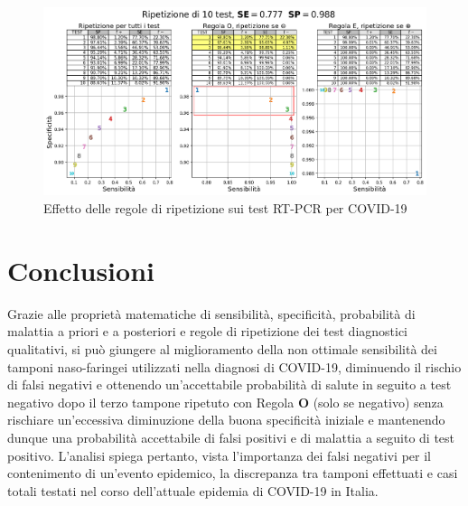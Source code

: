 \documentclass[11pt]{article}
\begin{document}
    
    \begin{figure}
\centering
    \includegraphics{ripetizione-covid}
    \caption{Effetto delle regole di ripetizione sui test RT-PCR per COVID-19}
    \label{fig:ripetizione-covid}
\end{figure}

    \hypertarget{conclusioni}{%
\section{Conclusioni}\label{conclusioni}}

Grazie alle proprietà matematiche di sensibilità, specificità,
probabilità di malattia a priori e a posteriori e regole di ripetizione
dei test diagnostici qualitativi, si può giungere al miglioramento della
non ottimale sensibilità dei tamponi naso-faringei utilizzati nella
diagnosi di COVID-19, diminuendo il rischio di falsi negativi e
ottenendo un'accettabile probabilità di salute in seguito a test
negativo dopo il terzo tampone ripetuto con Regola \textbf{O} (solo se
negativo) senza rischiare un'eccessiva diminuzione della buona
specificità iniziale e mantenendo dunque una probabilità accettabile di
falsi positivi e di malattia a seguito di test positivo. L'analisi
spiega pertanto, vista l'importanza dei falsi negativi per il
contenimento di un'evento epidemico, la discrepanza tra tamponi
effettuati e casi totali testati nel corso dell'attuale epidemia di
COVID-19 in Italia.


    
    



    
\end{document}

